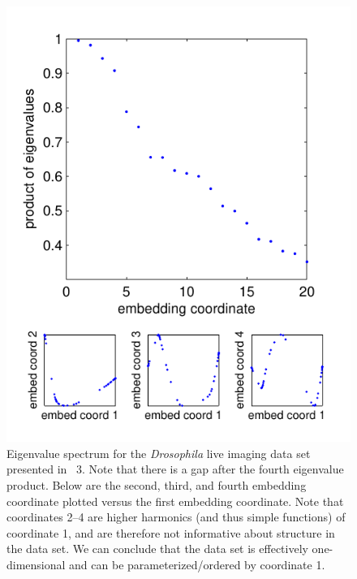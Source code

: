 \begin{figure}
\includegraphics{figS3}
\caption[Eigenvalue spectrum for the {\em Drosophila} live imaging data set]{Eigenvalue spectrum for the {\em Drosophila} live imaging data set presented in \fig~3. Note that there is a gap after the fourth eigenvalue product. Below are the second, third, and fourth embedding coordinate plotted versus the first embedding coordinate. Note that coordinates 2--4 are higher harmonics (and thus simple functions) of coordinate 1, and are therefore not informative about structure in the data set.  We can conclude that the data set is effectively one-dimensional and can be parameterized/ordered by coordinate 1.}
\label{fig:eigenvalues_drosophila_live}
\end{figure}


